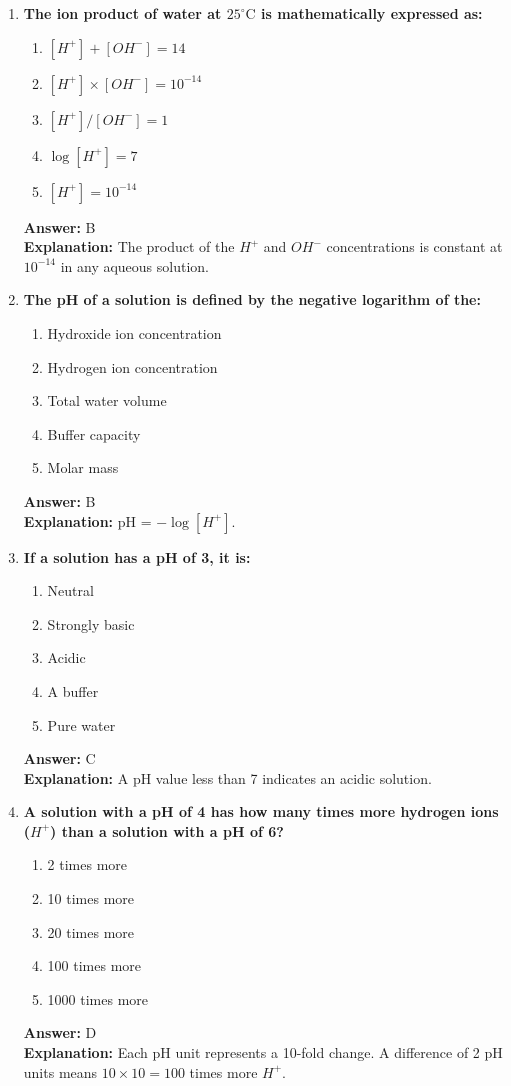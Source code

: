 \documentclass[11pt, a4paper]{article}
\begin{document}
\begin{enumerate}
\item \textbf{The ion product of water at $25^\circ\text{C}$ is mathematically expressed as:}
\begin{enumerate}[label=\Alph*.]
    \item $[H^+] + [OH^-] = 14$
    \item $[H^+] \times [OH^-] = 10^{-14}$
    \item $[H^+] / [OH^-] = 1$
    \item $\log[H^+] = 7$
    \item $[H^+] = 10^{-14}$
\end{enumerate}
\textbf{Answer:} B \\
\textbf{Explanation:} The product of the $H^+$ and $OH^-$ concentrations is constant at $10^{-14}$ in any aqueous solution.

\item \textbf{The pH of a solution is defined by the negative logarithm of the:}
\begin{enumerate}[label=\Alph*.]
    \item Hydroxide ion concentration
    \item Hydrogen ion concentration
    \item Total water volume
    \item Buffer capacity
    \item Molar mass
\end{enumerate}
\textbf{Answer:} B \\
\textbf{Explanation:} pH = $-\log[H^+]$.

\item \textbf{If a solution has a pH of 3, it is:}
\begin{enumerate}[label=\Alph*.]
    \item Neutral
    \item Strongly basic
    \item Acidic
    \item A buffer
    \item Pure water
\end{enumerate}
\textbf{Answer:} C \\
\textbf{Explanation:} A pH value less than 7 indicates an acidic solution.

\item \textbf{A solution with a pH of 4 has how many times more hydrogen ions ($H^+$) than a solution with a pH of 6?}
\begin{enumerate}[label=\Alph*.]
    \item 2 times more
    \item 10 times more
    \item 20 times more
    \item 100 times more
    \item 1000 times more
\end{enumerate}
\textbf{Answer:} D \\
\textbf{Explanation:} Each pH unit represents a 10-fold change. A difference of 2 pH units means $10 \times 10 = 100$ times more $H^+$.


\end{enumerate}
\end{document}
